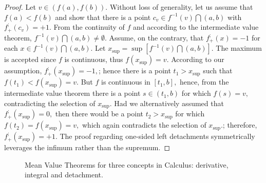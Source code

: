 \documentclass[11pt]{book}
\begin{document}
\begin{proof}Let $v\in\left(f\left(a\right),f\left(b\right)\right).$ Without loss of generality, let us assume that $f\left(a\right)<f\left(b\right)$ and show that there is a point $c_{v}\in f^{-1}\left(v\right)\bigcap\left(a,b\right)$ with $f^{;}_{+}\left(c_v\right)=+1.$ From the continuity of $f$ and according to the intermediate value theorem, $f^{-1}\left(v\right)\bigcap\left(a,b\right)\neq\emptyset. $ Assume, on the contrary, that $f_{+}^{;}\left(x\right)=-1$ for each $x\in f^{-1}\left(v\right)\bigcap\left(a,b\right).$ Let $x_{\sup}=\sup\left[f^{-1}\left(v\right)\bigcap\left(a,b\right)\right].$ The maximum is accepted since $f$ is continuous, thus $f\left(x_{\sup}\right)=v.$ According to our assumption, $f_{+}^{;}\left(x_{\sup}\right)=-1,$; hence there is a point $t_{1} > x_{\sup}$ such that $f\left(t_{1}\right) < f\left(x_{\sup}\right)=v.$ But $f$ is continuous in $\left[t_{1},b\right],$ hence, from the intermediate value theorem there is a point $s\in\left(t_{1},b\right)$ for which $f\left(s\right)=v,$ contradicting the selection of $x_{\sup}.$ Had we alternatively assumed that $f_{+}^{;}\left(x_{\sup}\right)=0,$ then there would be a point $t_{2} > x_{\sup}$ for which $f\left(t_{2}\right)=f\left(x_{\sup}\right)=v,$ which again contradicts the selection of $x_{\sup}.$; therefore, $f_{+}^{;}\left(x_{\sup}\right)=+1.$ The proof regarding one-sided left detachments symmetrically leverages the infimum rather than the supremum.
\end{proof}

\begin{figure}[htp]




\caption{Mean Value Theorems for three concepts in Calculus: derivative, integral and detachment.}

\end{figure}
\end{document}
